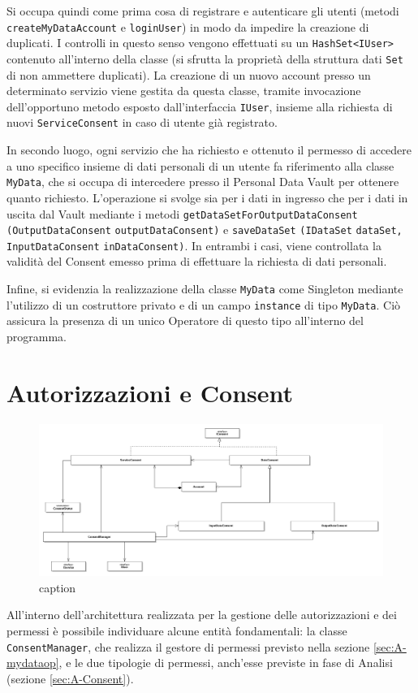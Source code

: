 Si occupa quindi come prima cosa di registrare e autenticare gli utenti (metodi \texttt{createMyDataAccount} e \texttt{loginUser}) in modo da impedire la creazione di duplicati. I controlli in questo senso vengono effettuati su un \texttt{HashSet<IUser>} contenuto all’interno della classe (si sfrutta la propriet\`a della struttura dati \texttt{Set} di non ammettere duplicati). La creazione di un nuovo account presso un determinato servizio viene gestita da questa classe, tramite invocazione dell’opportuno metodo esposto dall’interfaccia \texttt{IUser}, insieme alla richiesta di nuovi \texttt{ServiceConsent} in caso di utente gi\`a registrato.

In secondo luogo, ogni servizio che ha richiesto e ottenuto il permesso di accedere a uno specifico insieme di dati personali di un utente fa riferimento alla classe \texttt{MyData}, che si occupa di intercedere presso il Personal Data Vault per ottenere quanto richiesto. L’operazione si svolge sia per i dati in ingresso che per i dati in uscita dal Vault mediante i metodi \texttt{getDataSetForOutputDataConsent} \texttt{(OutputDataConsent} \texttt{outputDataConsent)} e \texttt{saveDataSet} \texttt{(IDataSet} \texttt{dataSet,} \texttt{InputDataConsent} \texttt{inDataConsent)}. In entrambi i casi, viene controllata la validit\`a del Consent emesso prima di effettuare la richiesta di dati personali.

Infine, si evidenzia la realizzazione della classe \texttt{MyData} come Singleton mediante l’utilizzo di un costruttore privato e di un campo \texttt{instance} di tipo \texttt{MyData}. Ci\`o assicura la presenza di un unico Operatore di questo tipo all’interno del programma.

\section{Autorizzazioni e Consent}
\label{sec:P-AutorizzazioniEConsent}
\begin{figure} [h]
\includegraphics[width=\linewidth]{pictures/Auth-closed.png}
\caption{caption}
\label{fig:Auth-closed}
\end{figure}
All'interno dell'architettura realizzata per la gestione delle autorizzazioni e dei permessi \`e possibile individuare alcune entit\`a fondamentali: la classe \texttt{ConsentManager}, che realizza il gestore di permessi previsto nella sezione \ref{sec:A-mydataop}, e le due tipologie di permessi, anch’esse previste in fase di Analisi (sezione \ref{sec:A-Consent}).

